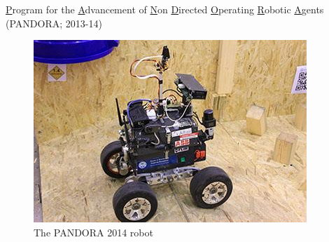 \begin{frame}{\small \underline{P}rogram for the \underline{A}dvancement of \underline{N}on \underline{D}irected \underline{O}perating \underline{R}obotic \underline{A}gents (PANDORA; 2013-14)}

\begin{figure}[H]\centering
  \includegraphics[scale=1.25]{figures/02/pandora_robot.jpg}
  \caption{The PANDORA 2014 robot}
  \label{fig:pandora_robot}
\end{figure}

\end{frame}
